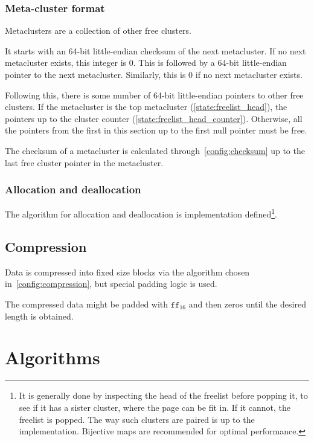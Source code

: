 \documentclass[11pt,a4paper]{report}
\begin{document}
        \subsection{Meta-cluster format}
        \label{cluster:metacluster}
        Metaclusters are a collection of other free clusters.

        It starts with an 64-bit little-endian checksum of the next
        metacluster. If no next metacluster exists, this integer is 0. This is
        followed by a 64-bit little-endian pointer to the next metacluster.
        Similarly, this is 0 if no next metacluster exists.

        Following this, there is some number of 64-bit little-endian pointers
        to other free clusters. If the metacluster is the top metacluster
        (\ref{state:freelist_head}), the pointers up to the cluster counter
        (\ref{state:freelist_head_counter}). Otherwise, all the pointers from
        the first in this section up to the first null pointer must be free.

        The checksum of a metacluster is calculated
        through~\ref{config:checksum} up to the last free cluster pointer in
        the metacluster.

        \subsection{Allocation and deallocation}
        The algorithm for allocation and deallocation is implementation
        defined\footnote{It is generally done by inspecting the head of the
        freelist before popping it, to see if it has a sister cluster,
        where the page can be fit in. If it cannot, the freelist is popped.
        The way such clusters are paired is up to the implementation.
        Bijective maps are recommended for optimal performance.}.

    \section{Compression}
    \label{cluster:compression}
        Data is compressed into fixed size blocks via the algorithm chosen
        in~\ref{config:compression}, but special padding logic is used.

        The compressed data might be padded with $\texttt{ff}_{16}$ and then
        zeros until the desired length is obtained.

    \chapter{Algorithms}
\end{document}
